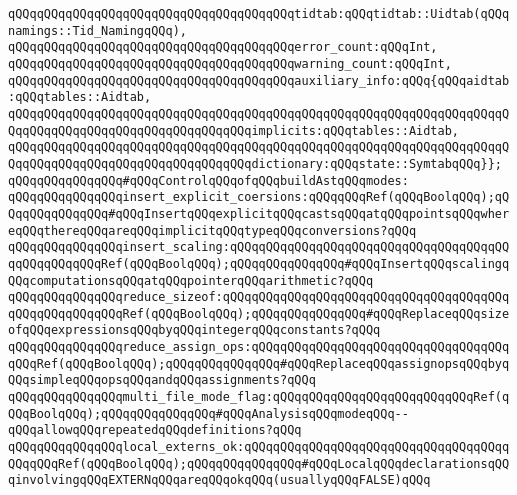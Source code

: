 \verb|qQQqqQQqqQQqqQQqqQQqqQQqqQQqqQQqqQQqqQQqtidtab:qQQqtidtab::Uidtab(qQQqnamings::Tid_NamingqQQq),|\newline
\verb|qQQqqQQqqQQqqQQqqQQqqQQqqQQqqQQqqQQqqQQqerror_count:qQQqInt,|\newline
\verb|qQQqqQQqqQQqqQQqqQQqqQQqqQQqqQQqqQQqqQQqwarning_count:qQQqInt,|\newline
\verb|qQQqqQQqqQQqqQQqqQQqqQQqqQQqqQQqqQQqqQQqauxiliary_info:qQQq{qQQqaidtab:qQQqtables::Aidtab,|\newline
\verb|qQQqqQQqqQQqqQQqqQQqqQQqqQQqqQQqqQQqqQQqqQQqqQQqqQQqqQQqqQQqqQQqqQQqqQQqqQQqqQQqqQQqqQQqqQQqqQQqqQQqqQQqimplicits:qQQqtables::Aidtab,|\newline
\verb|qQQqqQQqqQQqqQQqqQQqqQQqqQQqqQQqqQQqqQQqqQQqqQQqqQQqqQQqqQQqqQQqqQQqqQQqqQQqqQQqqQQqqQQqqQQqqQQqqQQqqQQqdictionary:qQQqstate::SymtabqQQq}};|\newline
\newline
\newline
\verb|qQQqqQQqqQQqqQQq#qQQqControlqQQqofqQQqbuildAstqQQqmodes:|\newline
\newline
\verb|qQQqqQQqqQQqqQQqinsert_explicit_coersions:qQQqqQQqRef(qQQqBoolqQQq);qQQqqQQqqQQqqQQq#qQQqInsertqQQqexplicitqQQqcastsqQQqatqQQqpointsqQQqwhereqQQqthereqQQqareqQQqimplicitqQQqtypeqQQqconversions?qQQq|\newline
\verb|qQQqqQQqqQQqqQQqinsert_scaling:qQQqqQQqqQQqqQQqqQQqqQQqqQQqqQQqqQQqqQQqqQQqqQQqqQQqRef(qQQqBoolqQQq);qQQqqQQqqQQqqQQq#qQQqInsertqQQqscalingqQQqcomputationsqQQqatqQQqpointerqQQqarithmetic?qQQq|\newline
\verb|qQQqqQQqqQQqqQQqreduce_sizeof:qQQqqQQqqQQqqQQqqQQqqQQqqQQqqQQqqQQqqQQqqQQqqQQqqQQqqQQqRef(qQQqBoolqQQq);qQQqqQQqqQQqqQQq#qQQqReplaceqQQqsizeofqQQqexpressionsqQQqbyqQQqintegerqQQqconstants?qQQq|\newline
\verb|qQQqqQQqqQQqqQQqreduce_assign_ops:qQQqqQQqqQQqqQQqqQQqqQQqqQQqqQQqqQQqqQQqRef(qQQqBoolqQQq);qQQqqQQqqQQqqQQq#qQQqReplaceqQQqassignopsqQQqbyqQQqsimpleqQQqopsqQQqandqQQqassignments?qQQq|\newline
\verb|qQQqqQQqqQQqqQQqmulti_file_mode_flag:qQQqqQQqqQQqqQQqqQQqqQQqqQQqRef(qQQqBoolqQQq);qQQqqQQqqQQqqQQq#qQQqAnalysisqQQqmodeqQQq--qQQqallowqQQqrepeatedqQQqdefinitions?qQQq|\newline
\verb|qQQqqQQqqQQqqQQqlocal_externs_ok:qQQqqQQqqQQqqQQqqQQqqQQqqQQqqQQqqQQqqQQqqQQqRef(qQQqBoolqQQq);qQQqqQQqqQQqqQQq#qQQqLocalqQQqdeclarationsqQQqinvolvingqQQqEXTERNqQQqareqQQqokqQQq(usuallyqQQqFALSE)qQQq|\newline
